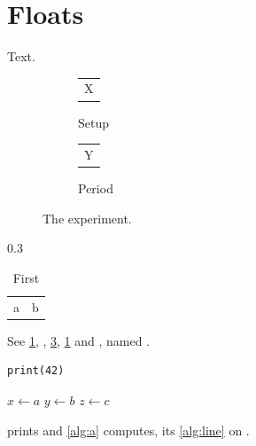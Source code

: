 \documentclass{article}
\begin{document}
\section{Floats}\label{sec:f}
Text.
\begin{figure}[h]
\centering
\begin{subfigure}{0.45\textwidth}
\centering
\begin{tabular}{c}X\end{tabular}
\caption{Setup}
\label{fig:s}
\end{subfigure}
\begin{subfigure}{0.45\textwidth}
\begin{tabular}{c}Y\end{tabular}
\caption{Period}\label{fig:p}
\end{subfigure}
\caption{The experiment.}
\label{fig:e}
\end{figure}
\begin{table}[h]
\caption{Before the subtables.}\label{tab:all}
\begin{subtable}{0.3\textwidth}
\caption{First}\label{tab:a}
\begin{tabular}{ll}a & b\\\end{tabular}
\end{subtable}
\end{table}
See \cref{fig:s}, , \cref{fig:e}, \cref{tab:a} and , named .
\begin{lstlisting}[caption={Printing a number},label={lst:a}]
print(42)
\end{lstlisting}

\begin{algorithm}[H]
\caption{Euclid}\label{alg:a}
\begin{algorithmic}[2]
\State $x \gets a$
\State $y \gets b$
\State $z \gets c$
\end{algorithmic}
\label{alg:line}
\end{algorithm}
 prints and \cref{alg:a} computes, its \cref{alg:line} on .
\end{document}
